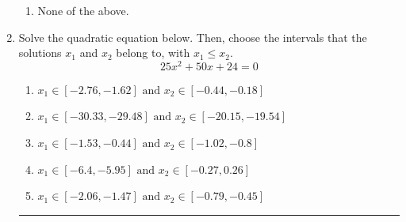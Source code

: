 \documentclass[14pt]{extbook}
\newcommand{\litem}[1]{\item#1\hspace*{-1cm}\rule{\textwidth}{0.4pt}}
\begin{document}
\begin{enumerate}
{\begin{enumerate}[label=\Alph*.]
\item None of the above.
\end{enumerate} }
\litem{
Solve the quadratic equation below. Then, choose the intervals that the solutions $x_1$ and $x_2$ belong to, with $x_1 \leq x_2$.\[ 25x^{2} +50 x + 24 = 0 \]\begin{enumerate}[label=\Alph*.]
\item \( x_1 \in [-2.76, -1.62] \text{ and } x_2 \in [-0.44, -0.18] \)
\item \( x_1 \in [-30.33, -29.48] \text{ and } x_2 \in [-20.15, -19.54] \)
\item \( x_1 \in [-1.53, -0.44] \text{ and } x_2 \in [-1.02, -0.8] \)
\item \( x_1 \in [-6.4, -5.95] \text{ and } x_2 \in [-0.27, 0.26] \)
\item \( x_1 \in [-2.06, -1.47] \text{ and } x_2 \in [-0.79, -0.45] \)


\end{enumerate}}
\end{enumerate}
\end{document}
